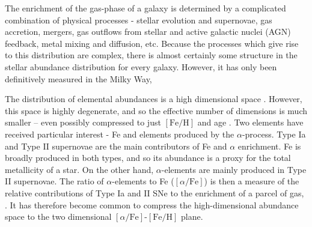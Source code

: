 \documentclass[twocolumn,linenumbers,trackchanges]{aastex631}
\newcommand{\FeH}{\ensuremath{[\textrm{Fe}/\textrm{H}]}}
\newcommand{\alphaFe}{\ensuremath{[\alpha/\textrm{Fe}]}}
\begin{document}
The enrichment of the gas-phase of a galaxy is determined by a complicated combination of physical processes - stellar evolution and supernovae, gas accretion, mergers, gas outflows from stellar and active galactic nuclei (AGN) feedback, metal mixing and diffusion, etc. Because the processes which give rise to this distribution are complex, there is almost certainly some structure in the stellar abundance distribution for every galaxy. However, it has only been definitively measured in the Milky Way, 

The distribution of elemental abundances is a high dimensional space \citep[e.g., 32 elements in][]{2024ApJ...961L..41J}. However, this space is highly degenerate, and so the effective number of dimensions is much smaller -- even possibly compressed to just \FeH{} and age \citep{2019ApJ...883..177N}. Two elements have received particular interest - Fe and elements produced by the $\alpha$-process. Type Ia and Type II supernovae are the main contributors of Fe and $\alpha$ enrichment. Fe is broadly produced in both types, and so its abundance is a proxy for the total metallicity of a star. On the other hand, $\alpha$-elements are mainly produced in Type II supernovae. The ratio of $\alpha$-elements to Fe (\alphaFe{}) is then a measure of the relative contributions of Type Ia and II SNe to the enrichment of a parcel of gas, . It has therefore become common to compress the high-dimensional abundance space to the two dimensional \alphaFe{}-\FeH{} plane.


\end{document}
